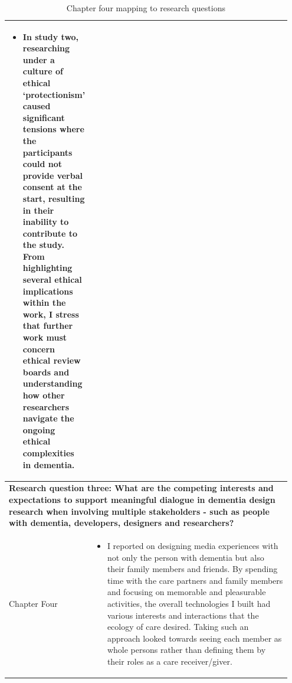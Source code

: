 \begin{table}[htp]
\begin{tabular}{p{0.15\linewidth} | p{0.8\linewidth}}
\begin{itemize}
        \item In study two, researching under a culture of ethical `protectionism' caused significant tensions where the participants could not provide verbal consent at the start, resulting in their inability to contribute to the study. From highlighting several ethical implications within the work, I stress that further work must concern ethical review boards and understanding how other researchers navigate the ongoing ethical complexities in dementia.

      \end{itemize}

       \\ \hline
    \multicolumn{2}{p{0.95\linewidth}}{\textbf{Research question three: What are the competing interests and expectations to support meaningful dialogue in dementia design research when involving multiple stakeholders - such as people with dementia, developers, designers and researchers?}} \\ \hline
      Chapter Four &
          \begin{itemize}
          \item I reported on designing media experiences with not only the person with dementia but also their family members and friends. By spending time with the care partners and family members and focusing on memorable and pleasurable activities, the overall technologies I built had various interests and interactions that the ecology of care desired. Taking such an approach looked towards seeing each member as whole persons rather than defining them by their roles as a care receiver/giver.
      \end{itemize}
    \\ 
    
    \end{tabular}
    \caption{Chapter four mapping to research questions}
    \label{chapterFourRQ}
\end{table}

